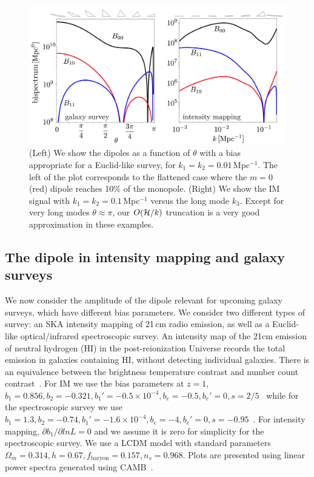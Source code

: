 \begin{figure}%
\begin{center}
\includegraphics[width=\columnwidth]{fig/figuresv2-01}
\caption{ (Left) We show the dipoles as a function of $\theta$ with a bias appropriate for a Euclid-like survey, for $k_1=k_2=0.01$\,Mpc$^{-1}$. The left of the plot corresponds to the flattened case where the $m=0$ (red) dipole reaches 10\% of the monopole.  (Right) We show the IM signal with $k_1=k_2=0.1$\,Mpc$^{-1}$ versus the long mode $k_3$. Except for very long modes $\theta\approx\pi$, our $O(\mathcal{H}/k)$ truncation is a very good approximation in these examples. }
\label{sankcjnakjdcs}
\end{center}
\end{figure}
 


\subsection*{The dipole in intensity mapping and galaxy surveys}

We now consider the amplitude of the dipole relevant for upcoming galaxy surveys, which have different bias parameters. We consider two different types of survey: an SKA intensity mapping of 21\,cm radio emission, as well as a Euclid-like optical/infrared spectroscopic survey.
An intensity map of the 21cm emission of neutral hydrogen (HI) in the post-reionization Universe records the total emission in galaxies containing HI, without detecting individual galaxies. There is an equivalence between the brightness temperature contrast and number count contrast~\citep{Umeh:2015gza}. For IM we use the bias parameters at $z=1$, 
$b_1 = 0.856, b_2 = -0.321, b_1' = -0.5\times10^{-4}, b_e = -0.5, b_e'=0, s = 2/5$~\citep{Fonseca:2018hsu,Umeh:2015gza}
while for the spectroscopic survey we use 
$ b_1 = 1.3,b_2 = -0.74, b_1' = -1.6\times10^{-4},  b_e = -4, b_e' = 0, s = -0.95$~\citep{Camera:2018jys,Yankelevich:2018uaz}.
For intensity mapping, $ \partial b_1/\partial ln L =0$ and we assume it is zero for simplicity for the spectroscopic survey. We use a LCDM model with standard parameters $\Omega_m=0.314, h=0.67, f_\text{baryon}=0.157, n_s=0.968$. Plots are presented using linear power spectra generated using CAMB~\citep{Lewis:1999bs}.

